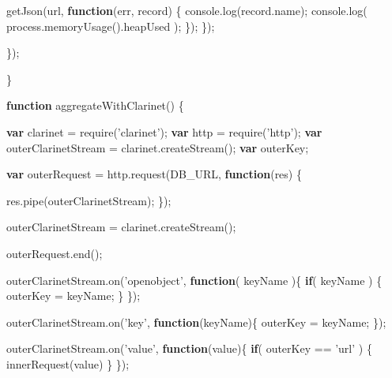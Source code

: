 \documentclass[12pt, ]{article}
\newenvironment{Shaded}{}{}
\newcommand{\KeywordTok}[1]{\textcolor[rgb]{0.00,0.44,0.13}{\textbf{{#1}}}}
\newcommand{\StringTok}[1]{\textcolor[rgb]{0.25,0.44,0.63}{{#1}}}
\newcommand{\OtherTok}[1]{\textcolor[rgb]{0.00,0.44,0.13}{{#1}}}
\newcommand{\FunctionTok}[1]{\textcolor[rgb]{0.02,0.16,0.49}{{#1}}}
\newcommand{\NormalTok}[1]{{#1}}
\begin{document}
\begin{Shaded}
\begin{Highlighting}[]
         \FunctionTok{getJson}\NormalTok{(url, }\KeywordTok{function}\NormalTok{(err, record) \{}
            \OtherTok{console}\NormalTok{.}\FunctionTok{log}\NormalTok{(}\OtherTok{record}\NormalTok{.}\FunctionTok{name}\NormalTok{);}
            \OtherTok{console}\NormalTok{.}\FunctionTok{log}\NormalTok{( }\OtherTok{process}\NormalTok{.}\FunctionTok{memoryUsage}\NormalTok{().}\FunctionTok{heapUsed} \NormalTok{);}
         \NormalTok{\});}
      \NormalTok{\});}

   \NormalTok{\});   }

\NormalTok{\}}


\KeywordTok{function} \FunctionTok{aggregateWithClarinet}\NormalTok{() \{}

   \KeywordTok{var} \NormalTok{clarinet = }\FunctionTok{require}\NormalTok{(}\StringTok{'clarinet'}\NormalTok{);   }
   \KeywordTok{var} \NormalTok{http = }\FunctionTok{require}\NormalTok{(}\StringTok{'http'}\NormalTok{);}
   \KeywordTok{var} \NormalTok{outerClarinetStream = }\OtherTok{clarinet}\NormalTok{.}\FunctionTok{createStream}\NormalTok{();}
   \KeywordTok{var} \NormalTok{outerKey;}
   
   \KeywordTok{var} \NormalTok{outerRequest = }\OtherTok{http}\NormalTok{.}\FunctionTok{request}\NormalTok{(DB_URL, }\KeywordTok{function}\NormalTok{(res) \{}
                              
      \OtherTok{res}\NormalTok{.}\FunctionTok{pipe}\NormalTok{(outerClarinetStream);}
   \NormalTok{\});}
   
   \NormalTok{outerClarinetStream = }\OtherTok{clarinet}\NormalTok{.}\FunctionTok{createStream}\NormalTok{();}
      
   \OtherTok{outerRequest}\NormalTok{.}\FunctionTok{end}\NormalTok{();}
      
   \OtherTok{outerClarinetStream}\NormalTok{.}\FunctionTok{on}\NormalTok{(}\StringTok{'openobject'}\NormalTok{, }\KeywordTok{function}\NormalTok{( keyName )\{      }
      \KeywordTok{if}\NormalTok{( keyName ) \{}
         \NormalTok{outerKey = keyName;      }
      \NormalTok{\}}
   \NormalTok{\});}
   
   \OtherTok{outerClarinetStream}\NormalTok{.}\FunctionTok{on}\NormalTok{(}\StringTok{'key'}\NormalTok{, }\KeywordTok{function}\NormalTok{(keyName)\{}
      \NormalTok{outerKey = keyName;}
   \NormalTok{\});}
   
   \OtherTok{outerClarinetStream}\NormalTok{.}\FunctionTok{on}\NormalTok{(}\StringTok{'value'}\NormalTok{, }\KeywordTok{function}\NormalTok{(value)\{}
      \KeywordTok{if}\NormalTok{( outerKey == }\StringTok{'url'} \NormalTok{) \{}
         \FunctionTok{innerRequest}\NormalTok{(value)}
      \NormalTok{\}}
   \NormalTok{\});      }
   

\end{Highlighting}
\end{Shaded}
\end{document}
